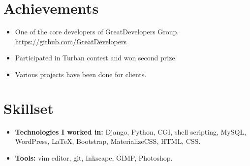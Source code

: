 \documentclass[10.1pt,a4paper,sans]{moderncv}        %
\begin{document}
\section{Achievements}

\vspace{3pt}

\begin{itemize}

\item One of the core developers of GreatDevelopers Group. \href{https://github.com/orgs/GreatDevelopers/people}{https://github.com/GreatDevelopers}
\item Participated in Turban contest and won second prize.
\item Various projects have been done for clients.

\end{itemize}

\section{Skillset}

\vspace{3pt}
 
\begin{itemize}

\item \textbf{Technologies I worked in:} Django, Python, CGI, shell scripting, MySQL, WordPress, LaTeX, Bootstrap, MaterializeCSS, HTML, CSS.

\item \textbf{Tools:} vim editor, git, Inkscape, GIMP, Photoshop.
\end{itemize}

\nocite{*}



\end{document}
